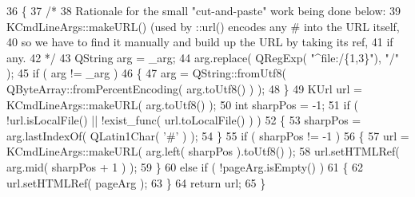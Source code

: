 \begin{DoxyCode}
36 \{
37     \textcolor{comment}{/*}
38 \textcolor{comment}{     Rationale for the small "cut-and-paste" work being done below:}
39 \textcolor{comment}{     KCmdLineArgs::makeURL() (used by ::url() encodes any # into the URL itself,}
40 \textcolor{comment}{     so we have to find it manually and build up the URL by taking its ref,}
41 \textcolor{comment}{     if any.}
42 \textcolor{comment}{     */}
43     QString arg = \_arg;
44     arg.replace( QRegExp( \textcolor{stringliteral}{"^file:/\{1,3\}"}), \textcolor{stringliteral}{"/"} );
45     \textcolor{keywordflow}{if} ( arg != \_arg )
46     \{
47         arg = QString::fromUtf8( QByteArray::fromPercentEncoding( arg.toUtf8() ) );
48     \}
49     KUrl url = KCmdLineArgs::makeURL( arg.toUtf8() );
50     \textcolor{keywordtype}{int} sharpPos = -1;
51     \textcolor{keywordflow}{if} ( !url.isLocalFile() || !exist\_func( url.toLocalFile() ) )
52     \{
53         sharpPos = arg.lastIndexOf( QLatin1Char( \textcolor{charliteral}{'#'} ) );
54     \}
55     \textcolor{keywordflow}{if} ( sharpPos != -1 )
56     \{
57       url = KCmdLineArgs::makeURL( arg.left( sharpPos ).toUtf8() );
58       url.setHTMLRef( arg.mid( sharpPos + 1 ) );
59     \}
60     \textcolor{keywordflow}{else} \textcolor{keywordflow}{if} ( !pageArg.isEmpty() )
61     \{
62       url.setHTMLRef( pageArg );
63     \}
64     \textcolor{keywordflow}{return} url;
65 \}
\end{DoxyCode}
